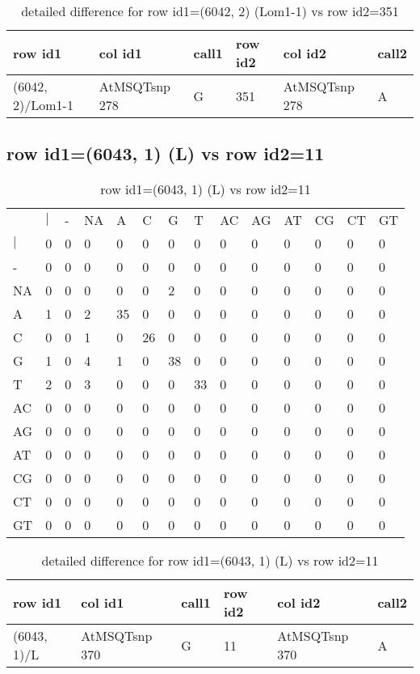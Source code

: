 \begin{center}
\begin{longtable}{|l|l|l|l|l|l|}
\caption{detailed difference for row id1=(6042, 2) (Lom1-1) vs row id2=351} \label{table_dm33}\\
\hline
row id1&col id1&call1&row id2&col id2&call2\\
\hline
(6042, 2)/Lom1-1&AtMSQTsnp 278&G&351&AtMSQTsnp 278&A\\
\hline
\end{longtable}
\end{center}

\subsection{row id1=(6043, 1) (L) vs row id2=11}
\begin{center}
\begin{longtable}{|l|l|l|l|l|l|l|l|l|l|l|l|l|l|}
\caption{row id1=(6043, 1) (L) vs row id2=11} \label{table_dm34}\\
\hline
\\
\hline
&$|$&-&NA&A&C&G&T&AC&AG&AT&CG&CT&GT\\
$|$&0&0&0&0&0&0&0&0&0&0&0&0&0\\
-&0&0&0&0&0&0&0&0&0&0&0&0&0\\
NA&0&0&0&0&0&2&0&0&0&0&0&0&0\\
A&1&0&2&35&0&0&0&0&0&0&0&0&0\\
C&0&0&1&0&26&0&0&0&0&0&0&0&0\\
G&1&0&4&1&0&38&0&0&0&0&0&0&0\\
T&2&0&3&0&0&0&33&0&0&0&0&0&0\\
AC&0&0&0&0&0&0&0&0&0&0&0&0&0\\
AG&0&0&0&0&0&0&0&0&0&0&0&0&0\\
AT&0&0&0&0&0&0&0&0&0&0&0&0&0\\
CG&0&0&0&0&0&0&0&0&0&0&0&0&0\\
CT&0&0&0&0&0&0&0&0&0&0&0&0&0\\
GT&0&0&0&0&0&0&0&0&0&0&0&0&0\\
\hline
\end{longtable}
\end{center}

\begin{center}
\begin{longtable}{|l|l|l|l|l|l|}
\caption{detailed difference for row id1=(6043, 1) (L) vs row id2=11} \label{table_dm35}\\
\hline
row id1&col id1&call1&row id2&col id2&call2\\
\hline
(6043, 1)/L&AtMSQTsnp 370&G&11&AtMSQTsnp 370&A\\
\hline
\end{longtable}
\end{center}


